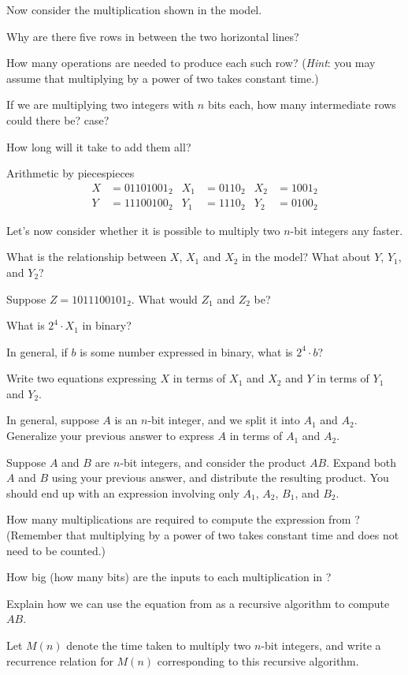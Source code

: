 \documentclass{tufte-handout}
\begin{document}
Now consider the multiplication shown in the model.

\begin{questions}
\item Why are there five rows in between the two horizontal lines?
\item How many operations are needed to produce each such row?
  (\emph{Hint}: you may assume that multiplying by a power of two
  takes constant time.)
\item If we are multiplying two integers with $n$ bits each, how many
  intermediate rows could there be?
  case?
\item How long will it take to add them all?
\end{questions}

\pause

\begin{model*}{Arithmetic by pieces}{pieces}
  \begin{align*}
    X &= 01101001_2 & X_1 &= 0110_2 & X_2 &= 1001_2 \\
    Y &= 11100100_2 & Y_1 &= 1110_2 & Y_2 &= 0100_2
  \end{align*}
\end{model*}

Let's now consider whether it is possible to multiply two $n$-bit
integers any faster.

\begin{questions}
\item What is the relationship between $X$, $X_1$ and $X_2$ in the
  model?  What about $Y$, $Y_1$, and $Y_2$?
\item Suppose $Z = 1011100101_2$.  What would $Z_1$ and $Z_2$ be?
\item What is $2^4 \cdot X_1$ in binary?
\item In general, if $b$ is some number expressed in binary, what is
  $2^4 \cdot b$?
\item Write two equations expressing $X$ in terms of $X_1$ and $X_2$
  and $Y$ in terms of $Y_1$ and $Y_2$.
\item In general, suppose $A$ is an $n$-bit integer, and we split it
  into $A_1$ and $A_2$.  Generalize your previous answer to express
  $A$ in terms of $A_1$ and $A_2$.
\newpage
\item \label{q:expr} Suppose $A$ and $B$ are $n$-bit integers, and consider the
  product $AB$. Expand both $A$ and $B$ using your previous answer,
  and distribute the resulting product.  You should end up with an
  expression involving only $A_1$, $A_2$, $B_1$, and $B_2$.
\item How many multiplications are required to compute the expression
  from ? (Remember that multiplying by a power of two
  takes constant time and does not need to be counted.)
\item How big (how many bits) are the inputs to each multiplication in
  ?
\item Explain how we can use the equation from  as a recursive
  algorithm to compute $AB$.
\item Let $M(n)$ denote the time taken to multiply two $n$-bit
  integers, and write a recurrence relation for $M(n)$ corresponding
  to this recursive algorithm.
\end{questions}
\end{document}
